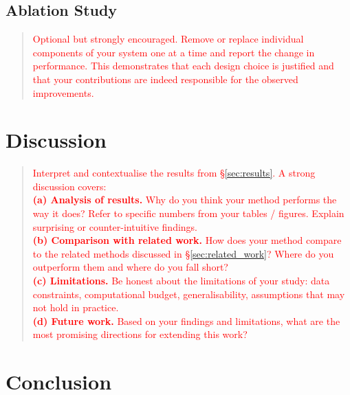 \documentclass[journal, 10pt, twoside]{IEEEtran}
\begin{document}
\subsection{Ablation Study}
\label{ssec:ablation}

\begin{quote}
  \textcolor{red}{%
    Optional but strongly encouraged. Remove or replace individual components of your system one at a time and report the change in performance. This demonstrates that each design choice is
    justified and that your contributions are indeed responsible for the observed improvements.%
  }
\end{quote}

\section{Discussion}
\label{sec:discussion}

\begin{quote}
  \textcolor{red}{%
    Interpret and contextualise the results from \S\ref{sec:results}. A strong discussion covers:\\[4pt]
    \textbf{(a) Analysis of results.}  Why do you think your method performs the way it does?  Refer to specific numbers from your tables / figures.  Explain surprising or counter-intuitive
    findings.\\[4pt]
    \textbf{(b) Comparison with related work.}  How does your method compare to the related methods discussed in \S\ref{sec:related_work}? Where do you outperform them and where do you fall short?\\[4pt]
    \textbf{(c) Limitations.}  Be honest about the limitations of your study: data constraints, computational budget, generalisability, assumptions that may not hold in practice.\\[4pt]
    \textbf{(d) Future work.}  Based on your findings and limitations, what are the most promising directions for extending this work?%
  }
\end{quote}

\section{Conclusion}
\label{sec:conclusion}
\end{document}
